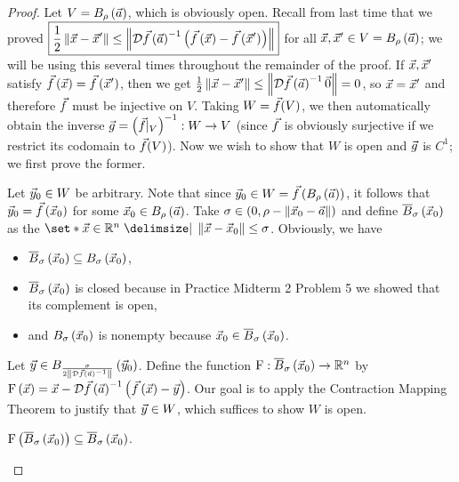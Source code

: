 \documentclass[main.tex]{subfiles}
\begin{document}
\begin{proof}
    Let $V = B_\rho\left( \vec{a} \right)$, which is obviously open. Recall from last time that we proved $\boxed{\frac{1}{2}\left\lVert \vec{x} - \vec{x}' \right\rVert \le \left\lVert \mathcal{D}\vec{f}\left( \vec{a} \right)^{-1}\left( \vec{f}\left( \vec{x} \right) - \vec{f}\left( \vec{x}' \right) \right) \right\rVert}$ for all $\vec{x}, \vec{x}'\in V = B_\rho\left( \vec{a} \right)$; we will be using this several times throughout the remainder of the proof. If $\vec{x}, \vec{x}'$ satisfy $\vec{f}\left( \vec{x} \right) = \vec{f}\left( \vec{x}' \right)$, then we get $\frac{1}{2}\left\lVert \vec{x} - \vec{x}' \right\rVert \le \left\lVert \mathcal{D}\vec{f}\left( \vec{a} \right)^{-1}\vec{0} \right\rVert = 0$, so $\vec{x} = \vec{x}'$ and therefore $\vec{f}$ must be injective on $V$. Taking $W = \vec{f}(V)$, we then automatically obtain the inverse $\vec{g} = \left( \vec{f} |_V \right)^{-1} : W \to V$ (since $\vec{f}$ is obviously surjective if we restrict its codomain to $\vec{f}(V)$). Now we wish to show that $W$ is open and $\vec{g}$ is $C^1$; we first prove the former.

    Let $\vec{y}_0\in W$ be arbitrary. Note that since $\vec{y}_0\in W = \vec{f}\left( B_\rho\left( \vec{a} \right) \right)$, it follows that $\vec{y}_0 = \vec{f}\left( \vec{x}_0 \right)$ for some $\vec{x}_0\in B_\rho\left( \vec{a} \right)$. Take $\sigma\in \left( 0, \rho - \left\lVert \vec{x}_0 - \vec{a} \right\rVert \right)$ and define $\overline{B}_\sigma\left( \vec{x}_0 \right)$ as the  $\set*{\vx\in \RR^n\mid \norm{\vx - \vx_0}\le \sigma}$. Obviously, we have
    \begin{itemize}
        \item $\overline{B}_\sigma\left( \vec{x}_0 \right)\subseteq B_\sigma\left( \vec{x}_0 \right)$,
        \item $\overline{B}_\sigma\left( \vec{x}_0 \right)$ is closed because in Practice Midterm 2 Problem 5 we showed that its complement is open,
        \item and $B_\sigma\left( \vec{x}_0 \right)$ is nonempty because $\vec{x}_0\in \overline{B}_\sigma\left( \vec{x}_0 \right)$.
    \end{itemize}
    Let $\vec{y}\in B_{\frac{\sigma}{2\left\lVert \mathcal{D}\vec{f}\left( \vec{a} \right)^{-1} \right\rVert}}\left( \vec{y}_0 \right)$. Define the function $\mathrm{F} : \overline{B}_\sigma\left( \vec{x}_0 \right) \to \mathbb R^n$ by $\mathrm{F}\left( \vec{x} \right) = \vec{x} - \mathcal{D}\vec{f}\left( \vec{a} \right)^{-1}\left( \vec{f}\left( \vec{x} \right) - \vec{y} \right)$. Our goal is to apply the Contraction Mapping Theorem to justify that $\vec{y}\in W$, which suffices to show $W$ is open.

    \begin{claim}
        $\mathrm{F}\left( \overline{B}_\sigma\left( \vec{x}_0 \right) \right) \subseteq \overline{B}_\sigma\left( \vec{x}_0 \right)$.
    \end{claim}


\end{proof}
\end{document}
